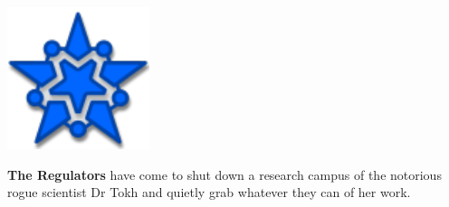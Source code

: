 \bigskip
\noindent\begin{minipage}{1.0\linewidth}\centering
  \begin{minipage}[c]{1in}
    \includegraphics[width=\linewidth]{art/icons/regulators.pdf}
  \end{minipage}\quad
  \begin{minipage}[c]{4in}
    \textbf{The Regulators} have come to shut down a research campus
    of the notorious rogue scientist Dr Tokh and quietly grab whatever
    they can of her work.
  \end{minipage}\quad
  \begin{minipage}[c]{1in}~
  \end{minipage}


\end{minipage}
